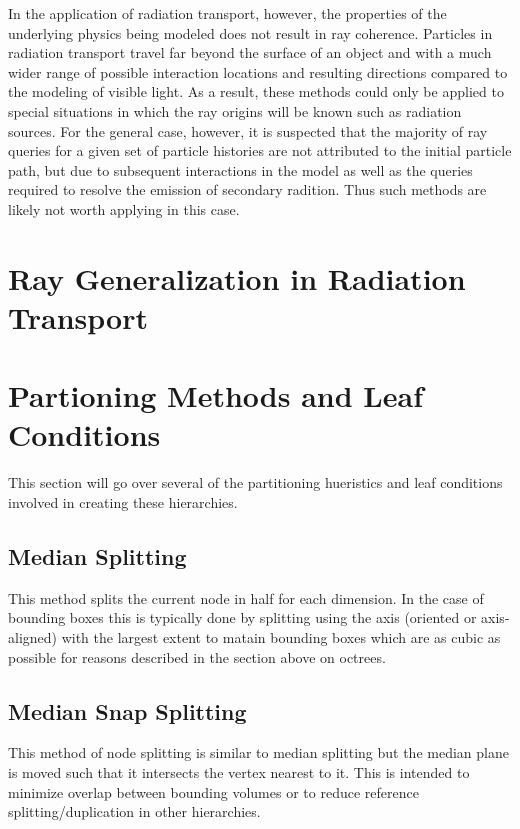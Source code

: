 \documentclass[10pt, a4paper]{article}
\begin{document}
In the application of radiation transport, however, the properties of the underlying physics being modeled does not result in ray coherence. Particles in radiation transport travel far beyond the surface of an object and with a much wider range of possible interaction locations and resulting directions compared to the modeling of visible light. As a result, these methods could only be applied to special situations in which the ray origins will be known such as radiation sources. For the general case, however, it is suspected that the majority of ray queries for a given set of particle histories are not attributed to the initial particle path, but due to subsequent interactions in the model as well as the queries required to resolve the emission of secondary radition. Thus such methods are likely not worth applying in this case.

\section{Ray Generalization in Radiation Transport}%



\section{Partioning Methods and Leaf Conditions}%

This section will go over several of the partitioning hueristics and leaf conditions involved in creating these hierarchies.

\subsection{Median Splitting}%

This method splits the current node in half for each dimension. In the case of bounding boxes this is typically done by splitting using the axis (oriented or axis-aligned) with the largest extent to matain bounding boxes which are as cubic as possible for reasons described in the section above on octrees.

\subsection{Median Snap Splitting}%

This method of node splitting is similar to median splitting but the median plane is moved such that it intersects the vertex nearest to it. This is intended to minimize overlap between bounding volumes or to reduce reference splitting/duplication in other hierarchies.
\end{document}
